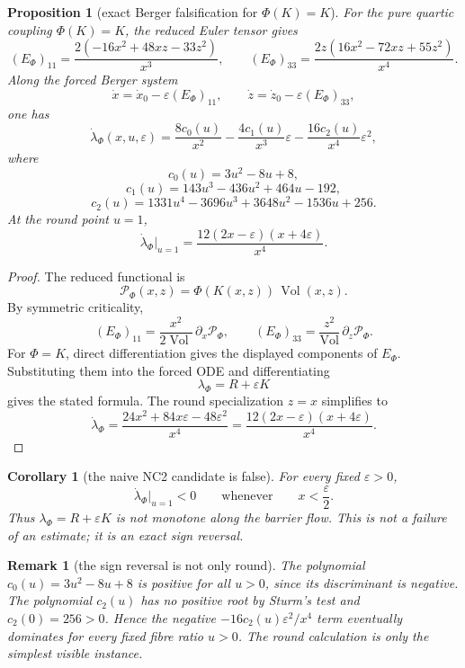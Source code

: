 \documentclass[11pt]{amsart}
\newtheorem{proposition}{Proposition}
\newtheorem{corollary}{Corollary}
\newtheorem{remark}{Remark}
\newcommand{\Vol}{\operatorname{Vol}}
\begin{document}
\begin{proposition}[exact Berger falsification for \(\Phi(K)=K\)]
For the pure quartic coupling \(\Phi(K)=K\), the reduced Euler tensor gives
\[
        (E_\Phi)_{11}
        =
        \frac{2(-16x^2+48xz-33z^2)}{x^3},
        \qquad
        (E_\Phi)_{33}
        =
        \frac{2z(16x^2-72xz+55z^2)}{x^4}.
\]
Along the forced Berger system
\[
        \dot x=\dot x_0-\varepsilon(E_\Phi)_{11},\qquad
        \dot z=\dot z_0-\varepsilon(E_\Phi)_{33},
\]
one has
\[
\boxed{
        \dot\lambda_\Phi(x,u,\varepsilon)
        =
        \frac{8c_0(u)}{x^2}
        -
        \frac{4c_1(u)}{x^3}\varepsilon
        -
        \frac{16c_2(u)}{x^4}\varepsilon^2,
}
\]
where
\[
        c_0(u)=3u^2-8u+8,
\]
\[
        c_1(u)=143u^3-436u^2+464u-192,
\]
\[
        c_2(u)=1331u^4-3696u^3+3648u^2-1536u+256 .
\]
At the round point \(u=1\),
\[
\boxed{
        \dot\lambda_\Phi\big|_{u=1}
        =
        \frac{12(2x-\varepsilon)(x+4\varepsilon)}{x^4}.
}
\]
\end{proposition}

\begin{proof}
The reduced functional is
\[
        \mathcal P_\Phi(x,z)=\Phi(K(x,z))\,\Vol(x,z).
\]
By symmetric criticality,
\[
        (E_\Phi)_{11}
        =
        \frac{x^2}{2\Vol}\,\partial_x\mathcal P_\Phi,
        \qquad
        (E_\Phi)_{33}
        =
        \frac{z^2}{\Vol}\,\partial_z\mathcal P_\Phi .
\]
For \(\Phi=K\), direct differentiation gives the displayed components of
\(E_\Phi\).  Substituting them into the forced ODE and differentiating
\[
        \lambda_\Phi=R+\varepsilon K
\]
gives the stated formula.  The round specialization \(z=x\) simplifies to
\[
        \dot\lambda_\Phi
        =
        \frac{24x^2+84x\varepsilon-48\varepsilon^2}{x^4}
        =
        \frac{12(2x-\varepsilon)(x+4\varepsilon)}{x^4}.
\]
\end{proof}

\begin{corollary}[the naive NC2 candidate is false]
For every fixed \(\varepsilon>0\),
\[
        \dot\lambda_\Phi\big|_{u=1}<0
        \qquad\text{whenever}\qquad
        x<\frac{\varepsilon}{2}.
\]
Thus \(\lambda_\Phi=R+\varepsilon K\) is not monotone along the barrier flow.
This is not a failure of an estimate; it is an exact sign reversal.
\end{corollary}

\begin{remark}[the sign reversal is not only round]
The polynomial \(c_0(u)=3u^2-8u+8\) is positive for all \(u>0\), since its
discriminant is negative.  The polynomial \(c_2(u)\) has no positive root by
Sturm's test and \(c_2(0)=256>0\).  Hence the negative
\(-16c_2(u)\varepsilon^2/x^4\) term eventually dominates for every fixed fibre
ratio \(u>0\).  The round calculation is only the simplest visible instance.
\end{remark}
\end{document}
